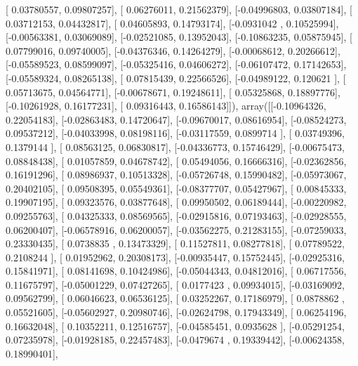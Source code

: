\documentclass{article}
\begin{document}
       [ 0.03780557,  0.09807257],
       [ 0.06276011,  0.21562379],
       [-0.04996803,  0.03807184],
       [ 0.03712153,  0.04432817],
       [ 0.04605893,  0.14793174],
       [-0.0931042 ,  0.10525994],
       [-0.00563381,  0.03069089],
       [-0.02521085,  0.13952043],
       [-0.10863235,  0.05875945],
       [ 0.07799016,  0.09740005],
       [-0.04376346,  0.14264279],
       [-0.00068612,  0.20266612],
       [-0.05589523,  0.08599097],
       [-0.05325416,  0.04606272],
       [-0.06107472,  0.17142653],
       [-0.05589324,  0.08265138],
       [ 0.07815439,  0.22566526],
       [-0.04989122,  0.120621  ],
       [ 0.05713675,  0.04564771],
       [-0.00678671,  0.19248611],
       [ 0.05325868,  0.18897776],
       [-0.10261928,  0.16177231],
       [ 0.09316443,  0.16586143]]), array([[-0.10964326,  0.22054183],
       [-0.02863483,  0.14720647],
       [-0.09670017,  0.08616954],
       [-0.08524273,  0.09537212],
       [-0.04033998,  0.08198116],
       [-0.03117559,  0.0899714 ],
       [ 0.03749396,  0.1379144 ],
       [ 0.08563125,  0.06830817],
       [-0.04336773,  0.15746429],
       [-0.00675473,  0.08848438],
       [ 0.01057859,  0.04678742],
       [ 0.05494056,  0.16666316],
       [-0.02362856,  0.16191296],
       [ 0.08986937,  0.10513328],
       [-0.05726748,  0.15990482],
       [-0.05973067,  0.20402105],
       [ 0.09508395,  0.05549361],
       [-0.08377707,  0.05427967],
       [ 0.00845333,  0.19907195],
       [ 0.09323576,  0.03877648],
       [ 0.09950502,  0.06189444],
       [-0.00220982,  0.09255763],
       [ 0.04325333,  0.08569565],
       [-0.02915816,  0.07193463],
       [-0.02928555,  0.06200407],
       [-0.06578916,  0.06200057],
       [-0.03562275,  0.21283155],
       [-0.07259033,  0.23330435],
       [ 0.0738835 ,  0.13473329],
       [ 0.11527811,  0.08277818],
       [ 0.07789522,  0.2108244 ],
       [ 0.01952962,  0.20308173],
       [-0.00935447,  0.15752445],
       [-0.02925316,  0.15841971],
       [ 0.08141698,  0.10424986],
       [-0.05044343,  0.04812016],
       [ 0.06717556,  0.11675797],
       [-0.05001229,  0.07427265],
       [ 0.0177423 ,  0.09934015],
       [-0.03169092,  0.09562799],
       [ 0.06046623,  0.06536125],
       [ 0.03252267,  0.17186979],
       [ 0.0878862 ,  0.05521605],
       [-0.05602927,  0.20980746],
       [-0.02624798,  0.17943349],
       [ 0.06254196,  0.16632048],
       [ 0.10352211,  0.12516757],
       [-0.04585451,  0.0935628 ],
       [-0.05291254,  0.07235978],
       [-0.01928185,  0.22457483],
       [-0.0479674 ,  0.19339442],
       [-0.00624358,  0.18990401],
\end{document}
